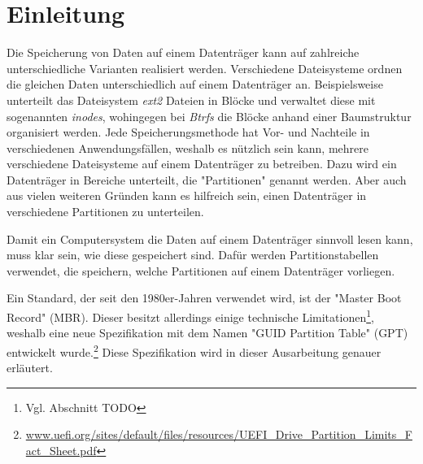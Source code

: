 \section{Einleitung}
Die Speicherung von Daten auf einem Datenträger kann auf zahlreiche unterschiedliche Varianten realisiert werden.
Verschiedene Dateisysteme ordnen die gleichen Daten unterschiedlich auf einem Datenträger an.
Beispielsweise unterteilt das Dateisystem \textit{ext2} Dateien in Blöcke und verwaltet diese mit sogenannten \textit{inodes}, wohingegen bei \textit{Btrfs} die Blöcke anhand einer Baumstruktur organisiert werden. 
Jede Speicherungsmethode hat Vor- und Nachteile in verschiedenen Anwendungsfällen, weshalb es nützlich sein kann, mehrere verschiedene Dateisysteme auf einem Datenträger zu betreiben.
Dazu wird ein Datenträger in Bereiche unterteilt, die "Partitionen" genannt werden.
Aber auch aus vielen weiteren Gründen kann es hilfreich sein, einen Datenträger in verschiedene Partitionen zu unterteilen.

Damit ein Computersystem die Daten auf einem Datenträger sinnvoll lesen kann, muss klar sein, wie diese gespeichert sind.
Dafür werden Partitionstabellen verwendet, die speichern, welche Partitionen auf einem Datenträger vorliegen.

Ein Standard, der seit den 1980er-Jahren verwendet wird, ist der "Master Boot Record" (MBR).
Dieser besitzt allerdings einige technische Limitationen\footnote{Vgl. Abschnitt TODO}, weshalb eine neue Spezifikation mit dem Namen "GUID Partition Table" (GPT) entwickelt wurde.\footnote{\url{www.uefi.org/sites/default/files/resources/UEFI_Drive_Partition_Limits_Fact_Sheet.pdf}}
Diese Spezifikation wird in dieser Ausarbeitung genauer erläutert.
